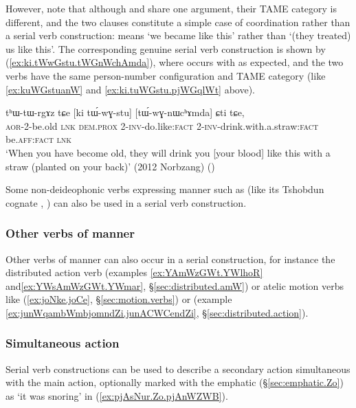 However, note that although  and  share one argument, their TAME category is different, and the two clauses constitute a simple case of coordination rather than a serial verb construction:  means `we became like this' rather than `(they treated) us like this'. The corresponding genuine serial verb construction is shown by (\ref{ex:ki.tWwGstu.tWGnWchAmda}), where  occurs with  as expected, and the two verbs have the same person-number configuration and TAME category (like \ref{ex:kuWGstuanW} and \ref{ex:ki.tuWGstu.pjWGqlWt} above).

\begin{exe}
\ex   \label{ex:ki.tWwGstu.tWGnWchAmda}
\gll tʰɯ-tɯ-rgɤz tɕe [ki tɯ́-wɣ-stu] [tɯ́-wɣ-nɯcʰɤmda] ɕti tɕe, \\
\textsc{aor}-2-be.old \textsc{lnk} \textsc{dem}.\textsc{prox} 2-\textsc{inv}-do.like:\textsc{fact} 2-\textsc{inv}-drink.with.a.straw:\textsc{fact} be.\textsc{aff}:\textsc{fact} \textsc{lnk} \\
\glt `When you have become old, they will drink you [your blood] like this with a straw (planted on your back)' (2012 Norbzang)
()
\end{exe}

Some non-deideophonic verbs expressing manner such as  (like its Tshobdun cognate , \citealt[490--491]{sun12complementation}) can also be used in a serial verb construction.

\subsubsection{Other verbs of manner} \label{sec:svc.manner.other}
Other verbs of manner can also occur in a serial construction, for instance the distributed action verb  (examples \ref{ex:YAmWzGWt.YWlhoR} and\ref{ex:YWsAmWzGWt.YWmar}, §\ref{sec:distributed.amW}) or atelic motion verbs like  (\ref{ex:joNke.joCe}, §\ref{sec:motion.verbs}) or   (example \ref{ex:junWqambWmbjomndZi.junACWCendZi}, §\ref{sec:distributed.action}).

\subsubsection{Simultaneous action} \label{sec:svc.simultaneous}
Serial verb constructions can be used to describe a secondary action simultaneous with the main action, optionally marked with the emphatic  (§\ref{sec:emphatic.Zo}) as  `it was snoring' in (\ref{ex:pjAsNur.Zo.pjAnWZWB}).

